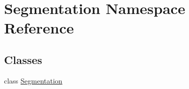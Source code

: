 \hypertarget{namespace_segmentation}{}\section{Segmentation Namespace Reference}
\label{namespace_segmentation}
\subsection*{Classes}
\begin{DoxyCompactItemize}
\item 
class \hyperlink{class_segmentation_1_1_segmentation}{Segmentation}
\end{DoxyCompactItemize}
